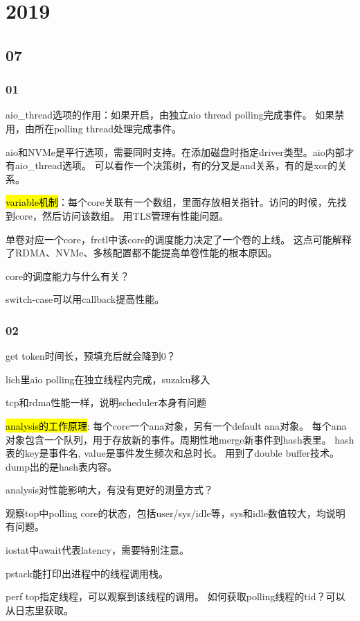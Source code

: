 \chapter{2019}

\section{07}

\subsection{01}

aio\_thread选项的作用：如果开启，由独立aio thread polling完成事件。
如果禁用，由所在polling thread处理完成事件。

aio和NVMe是平行选项，需要同时支持。在添加磁盘时指定driver类型。aio内部才有aio\_thread选项。
可以看作一个决策树，有的分叉是and关系，有的是xor的关系。

\hl{variable机制}：每个core关联有一个数组，里面存放相关指针。访问的时候，先找到core，然后访问该数组。
用TLS管理有性能问题。

单卷对应一个core，frctl中该core的调度能力决定了一个卷的上线。
这点可能解释了RDMA、NVMe、多核配置都不能提高单卷性能的根本原因。

core的调度能力与什么有关？

switch-case可以用callback提高性能。

\subsection{02}

get token时间长，预填充后就会降到0？

lich里aio polling在独立线程内完成，suzaku移入

tcp和rdma性能一样，说明scheduler本身有问题

\hl{analysis的工作原理}: 每个core一个ana对象，另有一个default ana对象。
每个ana对象包含一个队列，用于存放新的事件。周期性地merge新事件到hash表里。
hash表的key是事件名, value是事件发生频次和总时长。
用到了double buffer技术。dump出的是hash表内容。

analysis对性能影响大，有没有更好的测量方式？

观察top中polling core的状态，包括user/sys/idle等，sys和idle数值较大，均说明有问题。

iostat中await代表latency，需要特别注意。

pstack能打印出进程中的线程调用栈。

perf top指定线程，可以观察到该线程的调用。
如何获取polling线程的tid？可以从日志里获取。

